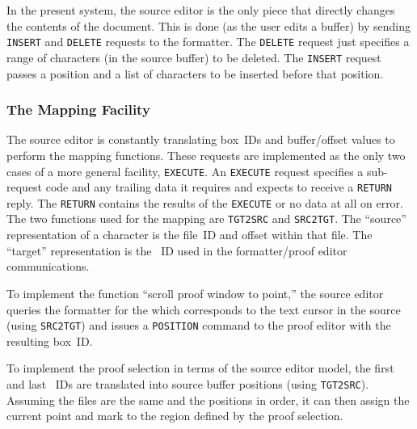 In the present system, the source editor is the only piece that
directly changes the contents of the document.  This is done
(as the user edits a buffer) by sending {\tt INSERT} and {\tt DELETE}
requests to the formatter.  The {\tt DELETE} request just specifies
a range of characters (in the source buffer) to be deleted.  The
{\tt INSERT} request passes a position and a list of characters
to be inserted before that position.

\subsubsection{The Mapping Facility}

The source editor is constantly translating box~IDs and buffer/offset
values to perform the mapping functions.  These requests are implemented
as the only two cases of a more general facility, {\tt EXECUTE}.
An {\tt EXECUTE} request specifies a sub-request code and any trailing
data it requires and expects to receive a {\tt RETURN} reply.
The {\tt RETURN} contains the results of the {\tt EXECUTE} or no
data at all on error.  The two functions used for the mapping are
{\tt TGT2SRC} and {\tt SRC2TGT}.  The ``source'' representation of
a character is the file~ID and offset within that file.  The
``target'' representation is the \tbox~ID used in the formatter/proof
editor communications.

To implement the function ``scroll proof window to point,'' the source
editor queries the formatter for the {\tbox} which corresponds to the
text cursor in the source (using {\tt SRC2TGT}) and issues a
{\tt POSITION} command to the proof editor with the resulting box~ID.

To implement the proof selection in terms of the source editor model,
the first and last \tbox~IDs are translated into source buffer
positions (using {\tt TGT2SRC}).  Assuming the files are the same
and the positions in order, it can then assign the current point and
mark to the region defined by the proof selection.
